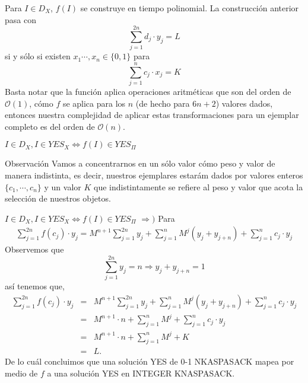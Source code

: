 \begin{frame}{Para $I \in D_X$, $f(I)$ se construye en tiempo polinomial.}
  La construcción anterior pasa con
  \[\sum_{j = 1}^{2n} d_j \cdot y_j = L\]
  si y sólo si existen $x_1 \dotsm, x_n \in  \{0, 1\}$ para
  \[\sum_{j = 1}^{n} c_j \cdot x_j = K\]
  Basta notar que la función aplica operaciones aritméticas que son del
  orden de $\mathcal{O}(1)$, cómo $f$ se aplica para los $n$ (de hecho para $6n + 2$)
  valores dados, entonces nuestra complejidad de aplicar estas transformaciones para
  un ejemplar completo es del orden de $\mathcal{O}(n)$.
  
\end{frame}

\begin{frame}{$I \in D_X, I \in YES_X \Leftrightarrow f(I) \in YES_{\Pi}$}

  \begin{block}{Observación}
    Vamos a concentrarnos en un sólo valor cómo peso y valor de manera indistinta, es decir, nuestros ejemplares
    estarám dados por valores enteros $\{c_1, \dotsm, c_n\}$ y un valor $K$ que indistintamente se refiere al peso
    y valor que acota la selección de nuestros objetos.\newline
  \end{block}
\end{frame}


\begin{frame}{$I \in D_X, I \in YES_X \Leftrightarrow f(I) \in YES_{\Pi}$}
  $\Rightarrow )$ Para
  \begin{eqnarray*}
    \sum_{j = 1}^{2n}f(c_j)\cdot y_j = M^{n + 1} \sum_{j = 1}^{2n} y_j + \sum_{j = 1}^{n} M^j (y_j + y_{j + n})
    + \sum_{j = 1}^{n} c_j \cdot y_j
  \end{eqnarray*}
  Observemos que
  \[\sum_{j = 1}^{2n} y_j = n \Rightarrow y_j + y_{j + n} = 1\]
  así tenemos que,
  \begin{eqnarray*}
    \sum_{j = 1}^{2n}f(c_j)\cdot y_j &=& M^{n + 1} \sum_{j = 1}^{2n} y_j + \sum_{j = 1}^{n} M^j (y_j + y_{j + n})
    + \sum_{j = 1}^{n} c_j \cdot y_j\\
    &=& M^{n + 1} \cdot n + \sum_{j = 1}^{n} M^j
    + \sum_{j = 1}^{n} c_j \cdot y_j\\
    &=& M^{n + 1} \cdot n + \sum_{j = 1}^{n} M^j
    + K\\
    &=& L.
  \end{eqnarray*}
  De lo cuál concluimos que una solución YES de 0-1 NKASPASACK mapea por medio
  de $f$ a una solución YES en INTEGER KNASPASACK.
\end{frame}

